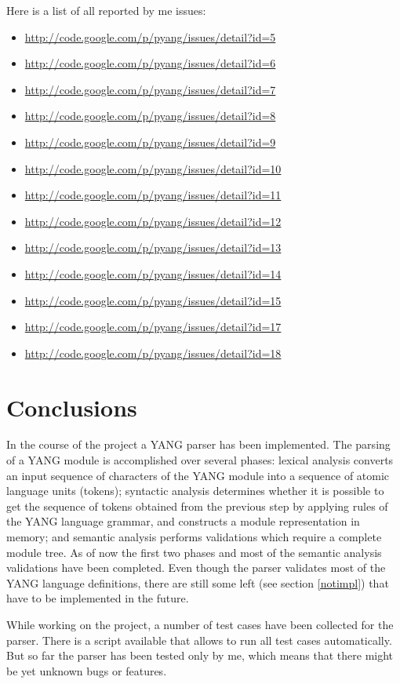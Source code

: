 \documentclass[conference]{IEEEtran}
\begin{document}
Here is a list of all reported by me issues:
\begin{itemize}
\item \url{http://code.google.com/p/pyang/issues/detail?id=5}
\item \url{http://code.google.com/p/pyang/issues/detail?id=6}
\item \url{http://code.google.com/p/pyang/issues/detail?id=7}
\item \url{http://code.google.com/p/pyang/issues/detail?id=8}
\item \url{http://code.google.com/p/pyang/issues/detail?id=9}
\item \url{http://code.google.com/p/pyang/issues/detail?id=10}
\item \url{http://code.google.com/p/pyang/issues/detail?id=11}
\item \url{http://code.google.com/p/pyang/issues/detail?id=12}
\item \url{http://code.google.com/p/pyang/issues/detail?id=13}
\item \url{http://code.google.com/p/pyang/issues/detail?id=14}
\item \url{http://code.google.com/p/pyang/issues/detail?id=15}
\item \url{http://code.google.com/p/pyang/issues/detail?id=17}
\item \url{http://code.google.com/p/pyang/issues/detail?id=18}
\end{itemize}

\section{Conclusions}
In the course of the project a YANG parser has been implemented.
The parsing of a YANG module is accomplished over several phases: 
lexical analysis converts an input sequence of characters of the YANG module into a sequence of atomic language units (tokens);
syntactic analysis determines whether it is possible to get the sequence of tokens obtained from the previous step by applying 
rules of the YANG language grammar, and constructs a module representation in memory; and semantic analysis performs 
validations which require a complete module tree. As of now the first two phases and most of the semantic analysis validations 
have been completed. Even though the parser validates most of the YANG language definitions,
there are still some left (see section \ref{notimpl}) that have to be implemented in the future.   

While working on the project, a number of test cases have been collected for the parser. There is a script available that allows
to run all test cases automatically. But so far the parser has been tested only by me, which means that there might be yet unknown bugs or features.
\end{document}
